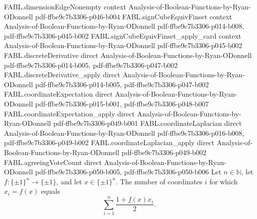 \begin{theorem}
  {FABL.dimensionEdgeNonempty}
  {context}
  {Analysis-of-Boolean-Functions-by-Ryan-ODonnell}
  {pdf-ffbe9c7b3306-p046-b004}
\proofstep
  {FABL.signCubeEquivFinset}
  {context}
  {Analysis-of-Boolean-Functions-by-Ryan-ODonnell}
  {pdf-ffbe9c7b3306-p014-b008,
    pdf-ffbe9c7b3306-p045-b002}
\proofstep
  {FABL.signCubeEquivFinset_apply_card}
  {context}
  {Analysis-of-Boolean-Functions-by-Ryan-ODonnell}
  {pdf-ffbe9c7b3306-p045-b002}
\proofstep
  {FABL.discreteDerivative}
  {direct}
  {Analysis-of-Boolean-Functions-by-Ryan-ODonnell}
  {pdf-ffbe9c7b3306-p014-b005,
    pdf-ffbe9c7b3306-p047-b002}
\proofstep
  {FABL.discreteDerivative_apply}
  {direct}
  {Analysis-of-Boolean-Functions-by-Ryan-ODonnell}
  {pdf-ffbe9c7b3306-p014-b005,
    pdf-ffbe9c7b3306-p047-b002}
\proofstep
  {FABL.coordinateExpectation}
  {direct}
  {Analysis-of-Boolean-Functions-by-Ryan-ODonnell}
  {pdf-ffbe9c7b3306-p015-b001,
    pdf-ffbe9c7b3306-p048-b007}
\proofstep
  {FABL.coordinateExpectation_apply}
  {direct}
  {Analysis-of-Boolean-Functions-by-Ryan-ODonnell}
  {pdf-ffbe9c7b3306-p049-b001}
\proofstep
  {FABL.coordinateLaplacian}
  {direct}
  {Analysis-of-Boolean-Functions-by-Ryan-ODonnell}
  {pdf-ffbe9c7b3306-p016-b008,
    pdf-ffbe9c7b3306-p049-b002}
\proofstep
  {FABL.coordinateLaplacian_apply}
  {direct}
  {Analysis-of-Boolean-Functions-by-Ryan-ODonnell}
  {pdf-ffbe9c7b3306-p049-b002}
\proofstep
  {FABL.agreeingVoteCount}
  {direct}
  {Analysis-of-Boolean-Functions-by-Ryan-ODonnell}
  {pdf-ffbe9c7b3306-p050-b005,
    pdf-ffbe9c7b3306-p050-b006}
Let $n\in\mathbb N$, let $f:\{\pm1\}^n\to\{\pm1\}$, and let $x\in\{\pm1\}^n$. The number
of coordinates $i$ for which $x_i=f(x)$ equals
\[
\sum_{i=1}^n\frac{1+f(x)x_i}{2}.
\]
\end{theorem}

